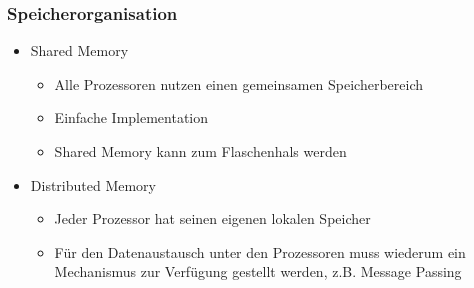 \subsubsection{Speicherorganisation}
\begin{multicols}{2}
	\begin{itemize}
		\item Shared Memory
		\begin{itemize}
			\item Alle Prozessoren nutzen einen gemeinsamen Speicherbereich 
			\item Einfache Implementation 
			\item Shared Memory kann zum Flaschenhals werden 
		\end{itemize}
	\end{itemize}
\columnbreak
	\begin{itemize}
		\item Distributed Memory
		\begin{itemize}
			\item Jeder Prozessor hat seinen eigenen lokalen Speicher 
			\item Für den Datenaustausch unter den Prozessoren muss wiederum ein Mechanismus zur Verfügung gestellt werden, z.B. Message Passing
		\end{itemize}
	\end{itemize}
\end{multicols}

